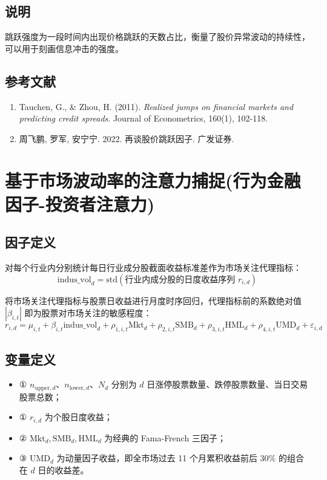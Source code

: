 \documentclass{article}
\begin{document}
\subsection{说明}
跳跃强度为一段时间内出现价格跳跃的天数占比，衡量了股价异常波动的持续性，可以用于刻画信息冲击的强度。

\subsection{参考文献}
\begin{enumerate}
    \item Tauchen, G., \& Zhou, H. (2011). \textit{Realized jumps on financial markets and predicting credit spreads}. Journal of Econometrics, 160(1), 102-118.
    \item 周飞鹏, 罗军, 安宁宁. 2022. 再谈股价跳跃因子. 广发证券.
\end{enumerate}

\section{基于市场波动率的注意力捕捉(行为金融因子-投资者注意力)}

\subsection{因子定义}

对每个行业内分别统计每日行业成分股截面收益标准差作为市场关注代理指标：
\begin{equation}
    \mathrm{indus\_vol}_d = \mathrm{std}(\text{行业内成分股的日度收益序列 } r_{i,d})
\end{equation}

将市场关注代理指标与股票日收益进行月度时序回归，代理指标前的系数绝对值 \(|\beta_{i,t}|\) 即为股票对市场关注的敏感程度：
\begin{equation}
    r_{i,d} = \mu_{i,t} + \beta_{i,t} \mathrm{indus\_vol}_d + \rho_{1,i,t} \mathrm{Mkt}_d + \rho_{2,i,t} \mathrm{SMB}_d + \rho_{3,i,t} \mathrm{HML}_d + \rho_{4,i,t} \mathrm{UMD}_d + \varepsilon_{i,d}
\end{equation}

\subsection{变量定义}
\begin{itemize}
     \item ① \(n_{\mathrm{upper},d}\)、\(n_{\mathrm{lower},d}\)、\(N_d\) 分别为 \(d\) 日涨停股票数量、跌停股票数量、当日交易股票总数；
    \item ① \( r_{i,d} \) 为个股日度收益；
    \item ② \( \mathrm{Mkt}_d, \mathrm{SMB}_d, \mathrm{HML}_d \) 为经典的 Fama-French 三因子；
    \item ③ \( \mathrm{UMD}_d \) 为动量因子收益，即全市场过去 11 个月累积收益前后 30\% 的组合在 \( d \) 日的收益差。
\end{itemize}
\end{document}
